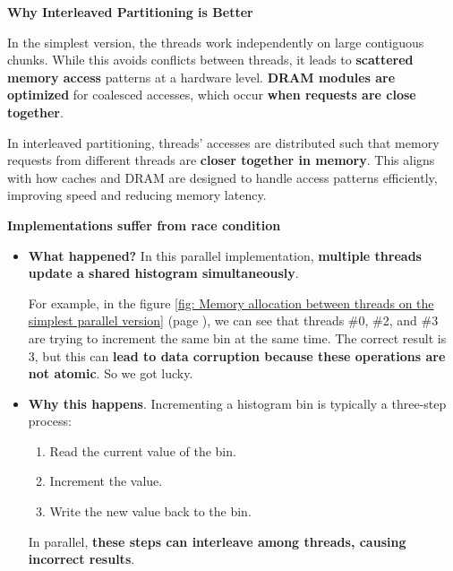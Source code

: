 \highspace
\begin{flushleft}
    \textcolor{Green3}{\faIcon{\speedIcon} \textbf{Why Interleaved Partitioning is Better}}
\end{flushleft}
In the simplest version, the threads work independently on large contiguous chunks. While this avoids conflicts between threads, it leads to \textbf{scattered memory access} patterns at a hardware level. \textbf{DRAM modules are optimized} for coalesced accesses, which occur \textbf{when requests are close together}.

\highspace
In interleaved partitioning, threads' accesses are distributed such that memory requests from different threads are \textbf{closer together in memory}. This aligns with how caches and DRAM are designed to handle access patterns efficiently, improving speed and reducing memory latency.

\newpage
\begin{flushleft}
    \textcolor{Red2}{ \textbf{Implementations suffer from race condition}}
\end{flushleft}
\begin{itemize}
    \item[\textcolor{Red2}{\faIcon{question-circle}}] \textcolor{Red2}{\textbf{What happened?}} In this parallel implementation, \textbf{multiple threads update a shared histogram simultaneously}.
    
    For example, in the figure \ref{fig: Memory allocation between threads on the simplest parallel version} (page \pageref{fig: Memory allocation between threads on the simplest parallel version}), we can see that threads \#0, \#2, and \#3 are trying to increment the same bin at the same time. The correct result is 3, but this can \textbf{lead to data corruption because these operations are not atomic}. So we got lucky.


    \item[\textcolor{Red2}{\faIcon{exclamation-circle}}] \textcolor{Red2}{\textbf{Why this happens}}. Incrementing a histogram bin is typically a three-step process:
    \begin{enumerate}
        \item Read the current value of the bin.
        \item Increment the value.
        \item Write the new value back to the bin.
    \end{enumerate}
    In parallel, \textbf{these steps can interleave among threads, causing incorrect results}.
\end{itemize}

